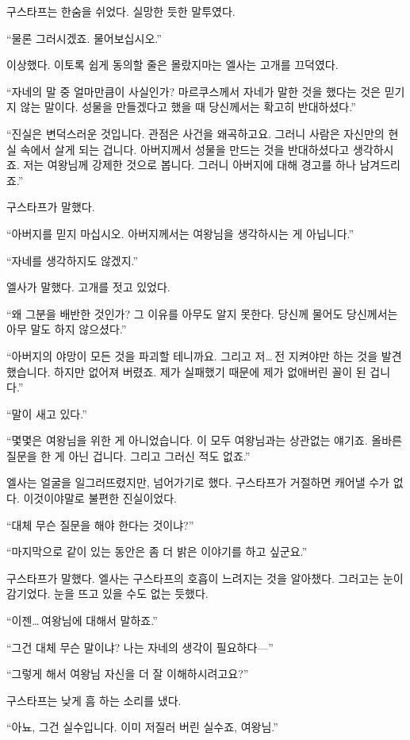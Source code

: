 구스타프는 한숨을 쉬었다. 실망한 듯한 말투였다.

``물론 그러시겠죠. 물어보십시오.''

이상했다. 이토록 쉽게 동의할 줄은 몰랐지마는 엘사는 고개를 끄덕였다.

``자네의 말 중 얼마만큼이 사실인가? 마르쿠스께서 자네가 말한 것을 했다는 것은 믿기지 않는 말이다. 성물을 만들겠다고 했을 때 당신께서는 확고히 반대하셨다.''

``진실은 변덕스러운 것입니다. 관점은 사건을 왜곡하고요. 그러니 사람은 자신만의 현실 속에서 살게 되는 겁니다. 아버지께서 성물을 만드는 것을 반대하셨다고 생각하시죠. 저는 여왕님께 강제한 것으로 봅니다. 그러니 아버지에 대해 경고를 하나 남겨드리죠.''

구스타프가 말했다.

``아버지를 믿지 마십시오. 아버지께서는 여왕님을 생각하시는 게 아닙니다.''

``자네를 생각하지도 않겠지.''

엘사가 말했다. 고개를 젓고 있었다.

``왜 그분을 배반한 것인가? 그 이유를 아무도 알지 못한다. 당신께 물어도 당신께서는 아무 말도 하지 않으셨다.''

``아버지의 야망이 모든 것을 파괴할 테니까요. 그리고 저\ldots\,전 지켜야만 하는 것을 발견했습니다. 하지만 없어져 버렸죠. 제가 실패했기 때문에 제가 없애버린 꼴이 된 겁니다.''

``말이 새고 있다.''

``몇몇은 여왕님을 위한 게 아니었습니다. 이 모두 여왕님과는 상관없는 얘기죠. 올바른 질문을 한 게 아닌 겁니다. 그리고 그러신 적도 없죠.''

엘사는 얼굴을 일그러뜨렸지만, 넘어가기로 했다. 구스타프가 거절하면 캐어낼 수가 없다. 이것이야말로 불편한 진실이었다.

``대체 무슨 질문을 해야 한다는 것이냐?''

``마지막으로 같이 있는 동안은 좀 더 밝은 이야기를 하고 싶군요.''

구스타프가 말했다. 엘사는 구스타프의 호흡이 느려지는 것을 알아챘다. 그러고는 눈이 감기었다. 눈을 뜨고 있을 수도 없는 듯했다.

``이젠\ldots\,여왕님에 대해서 말하죠.''

``그건 대체 무슨 말이냐? 나는 자네의 생각이 필요하다—''

``그렇게 해서 여왕님 자신을 더 잘 이해하시려고요?''

구스타프는 낮게 흠 하는 소리를 냈다.

``아뇨, 그건 실수입니다. 이미 저질러 버린 실수죠, 여왕님.''

